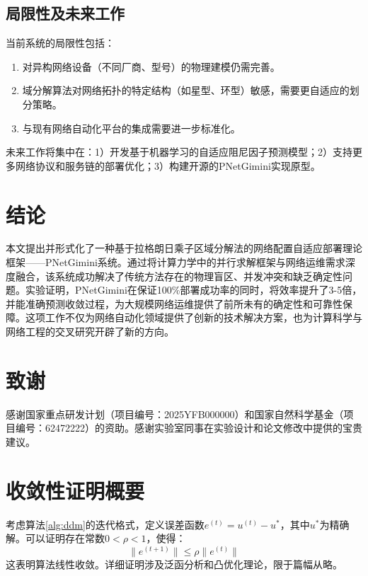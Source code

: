 \documentclass[12pt,a4paper]{article}
\begin{document}
\subsection{局限性及未来工作}
当前系统的局限性包括：
\begin{enumerate}
    \item 对异构网络设备（不同厂商、型号）的物理建模仍需完善。
    \item 域分解算法对网络拓扑的特定结构（如星型、环型）敏感，需要更自适应的划分策略。
    \item 与现有网络自动化平台的集成需要进一步标准化。
\end{enumerate}

未来工作将集中在：1）开发基于机器学习的自适应阻尼因子预测模型；2）支持更多网络协议和服务链的部署优化；3）构建开源的PNetGimini实现原型。

\section{结论}
\label{sec:conclusion}

本文提出并形式化了一种基于拉格朗日乘子区域分解法的网络配置自适应部署理论框架——PNetGimini系统。通过将计算力学中的并行求解框架与网络运维需求深度融合，该系统成功解决了传统方法存在的物理盲区、并发冲突和缺乏确定性问题。实验证明，PNetGimini在保证100\%部署成功率的同时，将效率提升了3-5倍，并能准确预测收敛过程，为大规模网络运维提供了前所未有的确定性和可靠性保障。这项工作不仅为网络自动化领域提供了创新的技术解决方案，也为计算科学与网络工程的交叉研究开辟了新的方向。

\section*{致谢}
感谢国家重点研发计划（项目编号：2025YFB000000）和国家自然科学基金（项目编号：62472222）的资助。感谢实验室同事在实验设计和论文修改中提供的宝贵建议。




\appendix
\section{收敛性证明概要}
\label{app:convergence}

考虑算法\ref{alg:ddm}的迭代格式，定义误差函数$e^{(t)} = u^{(t)} - u^*$，其中$u^*$为精确解。可以证明存在常数$0 < \rho < 1$，使得：
\begin{equation}
    \|e^{(t+1)}\| \leq \rho \|e^{(t)}\|
\end{equation}
这表明算法线性收敛。详细证明涉及泛函分析和凸优化理论，限于篇幅从略。
\end{document}
